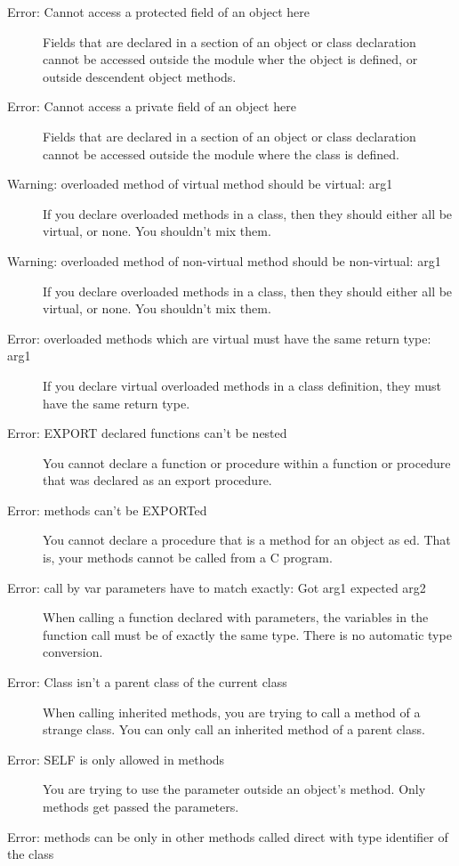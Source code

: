 \begin{description}
\item [Error: Cannot access a protected field of an object here]
 Fields that are declared in a  section of an object or class
 declaration cannot be accessed outside the module wher the object is
 defined, or outside descendent object methods.
\item [Error: Cannot access a private field of an object here]
 Fields that are declared in a  section of an object or class
 declaration cannot be accessed outside the module where the class is
 defined.
\item [Warning: overloaded method of virtual method should be virtual: arg1]
 If you declare overloaded methods in a class, then they should either all be
 virtual, or none. You shouldn't mix them.
\item [Warning: overloaded method of non-virtual method should be non-virtual: arg1]
 If you declare overloaded methods in a class, then they should either all be
 virtual, or none. You shouldn't mix them.
\item [Error: overloaded methods which are virtual must have the same return type: arg1]
 If you declare virtual overloaded methods in a class definition, they must
 have the same return type.
\item [Error: EXPORT declared functions can't be nested]
 You cannot declare a function or procedure within a function or procedure
 that was declared as an export procedure.
\item [Error: methods can't be EXPORTed]
 You cannot declare a procedure that is a method for an object as
 ed. That is, your methods cannot be called from a C program.
\item [Error: call by var parameters have to match exactly: Got arg1 expected arg2]
 When calling a function declared with  parameters, the variables in
 the function call must be of exactly the same type. There is no automatic
 type conversion.
\item [Error: Class isn't a parent class of the current class]
 When calling inherited methods, you are trying to call a method of a strange
 class. You can only call an inherited method of a parent class.
\item [Error: SELF is only allowed in methods]
 You are trying to use the  parameter outside an object's method.
 Only methods get passed the  parameters.
\item [Error: methods can be only in other methods called direct with type identifier of the class]

\end{description}
